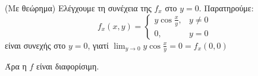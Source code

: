 \begin{examples}
\begin{enumerate}
\begin{solution}{(Με θεώρημα)}
                        Ελέγχουμε τη συνέχεια της $ f_{x} $ στο $ y=0 $. Παρατηρούμε:
                        \[
                            f_{x}(x,y) = \begin{cases} y \cos{\frac{x}{y}}, & y \neq 0 \\ 0, & y=0 \end{cases}  
                         \] 
                         είναι συνεχής στο $ y=0 $, γιατί $ \lim_{y \to 0} y \cos{\frac{x}{y}
                         } = 0 = f_{x}(0,0) $
                         
                         Άρα η $f$ είναι διαφορίσιμη.
                    \end{solution}
            \end{enumerate}
        \end{examples}

     
